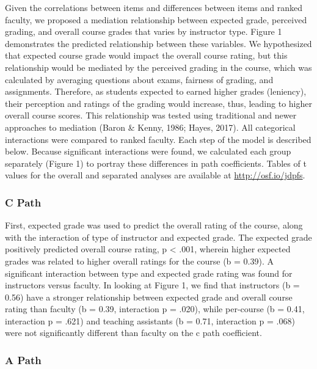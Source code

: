\documentclass[man]{apa6}
\theoremstyle{definition}
\theoremstyle{definition}
\theoremstyle{definition}
\theoremstyle{remark}
\begin{document}
Given the correlations between items and differences between items and
ranked faculty, we proposed a mediation relationship between expected
grade, perceived grading, and overall course grades that varies by
instructor type. Figure 1 demonstrates the predicted relationship
between these variables. We hypothesized that expected course grade
would impact the overall course rating, but this relationship would be
mediated by the perceived grading in the course, which was calculated by
averaging questions about exams, fairness of grading, and assignments.
Therefore, as students expected to earned higher grades (leniency),
their perception and ratings of the grading would increase, thus,
leading to higher overall course scores. This relationship was tested
using traditional and newer approaches to mediation (Baron \& Kenny,
1986; Hayes, 2017). All categorical interactions were compared to ranked
faculty. Each step of the model is described below. Because significant
interactions were found, we calculated each group separately (Figure 1)
to portray these differences in path coefficients. Tables of t values
for the overall and separated analyses are available at
\url{http://osf.io/jdpfs}.

\hypertarget{c-path}{%
\subsubsection{C Path}\label{c-path}}

First, expected grade was used to predict the overall rating of the
course, along with the interaction of type of instructor and expected
grade. The expected grade positively predicted overall course rating, p
\textless{} .001, wherein higher expected grades was related to higher
overall ratings for the course (b = 0.39). A significant interaction
between type and expected grade rating was found for instructors versus
faculty. In looking at Figure 1, we find that instructors (b = 0.56)
have a stronger relationship between expected grade and overall course
rating than faculty (b = 0.39, interaction p = .020), while per-course
(b = 0.41, interaction p = .621) and teaching assistants (b = 0.71,
interaction p = .068) were not significantly different than faculty on
the c path coefficient.

\hypertarget{a-path}{%
\subsubsection{A Path}\label{a-path}}
\end{document}
